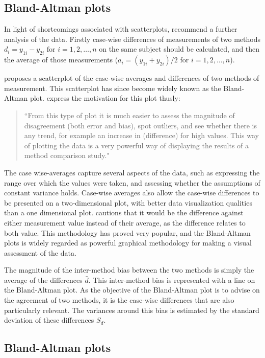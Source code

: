 \documentclass[Main.tex]{subfiles}
\begin{document}
\subsection{Bland-Altman plots}

In light of shortcomings associated with scatterplots,
\citet*{BA83} recommend a further analysis of the data. Firstly
case-wise differences of measurements of two methods $d_{i} =
y_{1i}-y_{2i} \mbox{ for }i=1,2,\dots,n$ on the same subject
should be calculated, and then the average of those measurements
($a_{i} = (y_{1i} + y_{2i})/2 \mbox{ for }i=1,2,\dots, n$).

\citet{BA83} proposes a scatterplot of the case-wise averages and differences of two methods of measurement. This scatterplot has since become widely known as the Bland-Altman plot. \citet*{BA83} express the
motivation for this plot thusly:
\begin{quote}
	``From this type of plot it is much easier to assess the magnitude
	of disagreement (both error and bias), spot outliers, and see
	whether there is any trend, for example an increase in (difference) for high values. This way of plotting the data is a very powerful way of displaying the results of a method comparison study."
\end{quote}

The case wise-averages capture several aspects of the data, such as expressing the range over which the values were taken, and assessing whether the assumptions of constant variance holds.
Case-wise averages also allow the case-wise differences to be presented on a two-dimensional plot, with better data visualization qualities than a one dimensional plot. \citet{BA86}
cautions that it would be the difference against either measurement value instead of their average, as the difference relates to both value. This methodology has proved very popular, and the Bland-Altman plots is widely regarded as powerful graphical methodology for making a visual assessment of the data.

The magnitude of the inter-method bias between the two methods is simply the average of the differences $\bar{d}$. This inter-method bias is represented with a line on the Bland-Altman plot. As the objective of the Bland-Altman plot is to advise on the agreement of two methods, it is the case-wise differences that are also particularly relevant. The variances around this bias is estimated by the standard deviation of these differences $S_{d}$.

\subsection{Bland-Altman plots}
\end{document}
